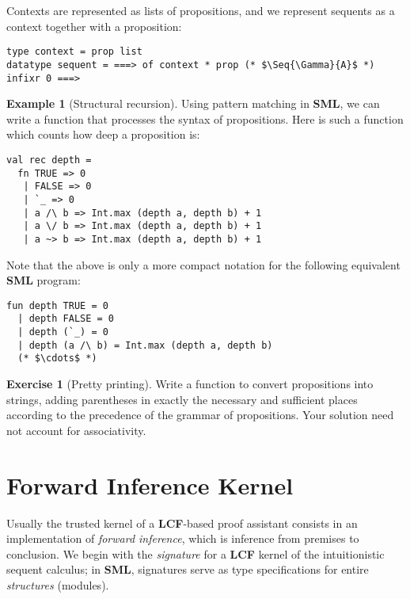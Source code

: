 \documentclass{article}
\newcommand\FormatLang[1]{{\bfseries\sffamily #1}}
\newcommand\SML{\FormatLang{SML}}
\newcommand\LCF{\FormatLang{LCF}}
\newcommand\Seq[2]{{#1}\Longrightarrow{#2}}
\theoremstyle{definition}
\newtheorem{example}{Example}[section]
\newtheorem{exercise}{Exercise}[section]
\theoremstyle{remark}
\begin{document}
Contexts are represented as lists of propositions, and we represent
sequents as a context together with a proposition:

\begin{verbatim}
type context = prop list
datatype sequent = ===> of context * prop (* $\Seq{\Gamma}{A}$ *)
infixr 0 ===>
\end{verbatim}

\begin{example}[Structural recursion]
  Using pattern matching in \SML, we can write a function that
  processes the syntax of propositions. Here is such a function which
  counts how deep a proposition is:
\begin{verbatim}
val rec depth =
  fn TRUE => 0
   | FALSE => 0
   | `_ => 0
   | a /\ b => Int.max (depth a, depth b) + 1
   | a \/ b => Int.max (depth a, depth b) + 1
   | a ~> b => Int.max (depth a, depth b) + 1
\end{verbatim}

  Note that the above is only a more compact notation for the
  following equivalent \SML{} program:
\begin{verbatim}
fun depth TRUE = 0
  | depth FALSE = 0
  | depth (`_) = 0
  | depth (a /\ b) = Int.max (depth a, depth b)
  (* $\cdots$ *)
\end{verbatim}

\end{example}

\begin{exercise}[Pretty printing]
  Write a function to convert propositions into strings, adding
  parentheses in exactly the necessary and sufficient places according
  to the precedence of the grammar of propositions. Your solution need
  not account for associativity.
\end{exercise}


\section{Forward Inference Kernel}

Usually the trusted kernel of a \LCF{}-based proof assistant consists
in an implementation of \emph{forward inference}, which is inference
from premises to conclusion. We begin with the \emph{signature} for a
\LCF{} kernel of the intuitionistic sequent calculus; in \SML{},
signatures serve as type specifications for entire \emph{structures}
(modules).
\end{document}
